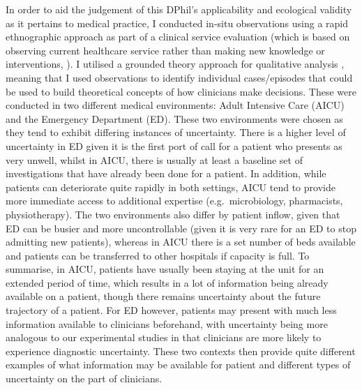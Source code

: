 \documentclass[a4paper, nobind]{templates/ociamthesis}
\begin{document}
\hfill\break
In order to aid the judgement of this DPhil's applicability and ecological validity as it pertains to medical practice, I conducted in-situ observations using a rapid ethnographic approach \autocite{vindrola-padros_quick_2018} as part of a clinical service evaluation (which is based on observing current healthcare service rather than making new knowledge or interventions, \textcite{twycross_service_2014}). I utilised a grounded theory approach for qualitative analysis \autocite{smith1995}, meaning that I used observations to identify individual cases/episodes that could be used to build theoretical concepts of how clinicians make decisions. These were conducted in two different medical environments: Adult Intensive Care (AICU) and the Emergency Department (ED). These two environments were chosen as they tend to exhibit differing instances of uncertainty. There is a higher level of uncertainty in ED given it is the first port of call for a patient who presents as very unwell, whilst in AICU, there is usually at least a baseline set of investigations that have already been done for a patient. In addition, while patients can deteriorate quite rapidly in both settings, AICU tend to provide more immediate access to additional expertise (e.g.~microbiology, pharmacists, physiotherapy). The two environments also differ by patient inflow, given that ED can be busier and more uncontrollable (given it is very rare for an ED to stop admitting new patients), whereas in AICU there is a set number of beds available and patients can be transferred to other hospitals if capacity is full. To summarise, in AICU, patients have usually been staying at the unit for an extended period of time, which results in a lot of information being already available on a patient, though there remains uncertainty about the future trajectory of a patient. For ED however, patients may present with much less information available to clinicians beforehand, with uncertainty being more analogous to our experimental studies in that clinicians are more likely to experience diagnostic uncertainty. These two contexts then provide quite different examples of what information may be available for patient and different types of uncertainty on the part of clinicians.
\end{document}
